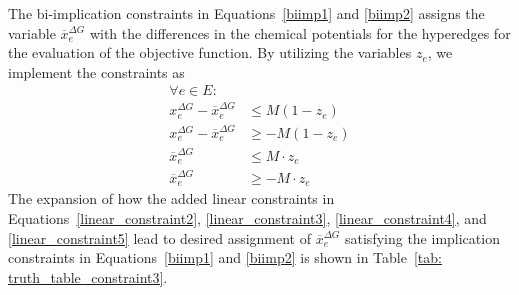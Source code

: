 The bi-implication constraints in Equations~\eqref{biimp1} and \eqref{biimp2} assigns the variable $\overline{x}^{\Delta G}_e$ with the differences in the chemical potentials for the hyperedges for the evaluation of the objective function.
By utilizing the variables $z_e$, we implement the constraints as
\begin{align}
    \forall e \in E\colon & \nonumber \\
    x^{\Delta G}_e - \overline{x}^{\Delta G}_e &\leq M(1 - z_e) \label{linear_constraint2} \\
    x^{\Delta G}_e - \overline{x}^{\Delta G}_e &\geq -M(1 - z_e) \label{linear_constraint3} \\
    \overline{x}^{\Delta G}_e &\leq M\cdot z_e \label{linear_constraint4} \\
    \overline{x}^{\Delta G}_e &\geq -M\cdot z_e \label{linear_constraint5}
\end{align}
The expansion of how the added linear constraints in Equations~\eqref{linear_constraint2}, \eqref{linear_constraint3}, \eqref{linear_constraint4}, and \eqref{linear_constraint5} lead to desired assignment of $\overline{x}^{\Delta G}_e$ satisfying the implication constraints in Equations~\eqref{biimp1} and \eqref{biimp2} is shown in Table~\ref{tab: truth_table_constraint3}.

